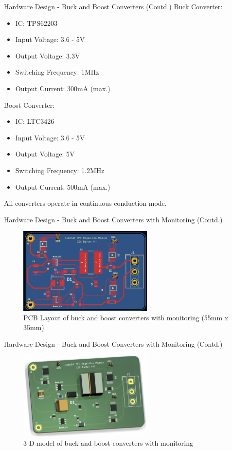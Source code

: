 \documentclass[aspectratio=169]{beamer}
\begin{document}
		\begin{frame}{Hardware Design - Buck and Boost Converters (Contd.)}
			Buck Converter:
			\begin{itemize}
				\item IC: TPS62203
				\item Input Voltage: 3.6 - 5V
				\item Output Voltage: 3.3V
				\item Switching Frequency: 1MHz
				\item Output Current: 300mA (max.)
			\end{itemize}
			Boost Converter:
			\begin{itemize}
				\item IC: LTC3426
				\item Input Voltage: 3.6 - 5V
				\item Output Voltage: 5V
				\item Switching Frequency: 1.2MHz
				\item Output Current: 500mA (max.)
			\end{itemize}
			All converters operate in continuous conduction mode.
		\end{frame}
		\begin{frame}{Hardware Design - Buck and Boost Converters with Monitoring (Contd.) }
			\begin{figure}[h]
				\centering
				\includegraphics[width=0.6\textwidth]{diag/1 pcb.png}
				\caption{PCB Layout of buck and boost converters with monitoring (55mm x 35mm)}
				\label{fig:bubo}
			\end{figure}
		\end{frame}
		\begin{frame}{Hardware Design - Buck and Boost Converters with Monitoring (Contd.) }
			\begin{figure}[h]
				\centering
				\includegraphics[width=0.6\textwidth]{diag/1 3d.png}
				\caption{3-D model of buck and boost converters with monitoring}
				\label{fig:bubo}
			\end{figure}
		\end{frame}
		
\end{document}
